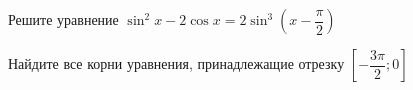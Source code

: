 \begin{ex}
	\begin{condition}
		\begin{enumcols}[label=\asbuk*)]
			\item Решите уравнение \( \sin^2 x - 2\cos x = 2\sin^3{\left(x - \dfrac{\pi}{2}\right)} \)
			\item Найдите все корни уравнения, принадлежащие отрезку \( \left[-\dfrac{3\pi}{2};0\right]  \)
		\end{enumcols}
	\end{condition}
\end{ex}